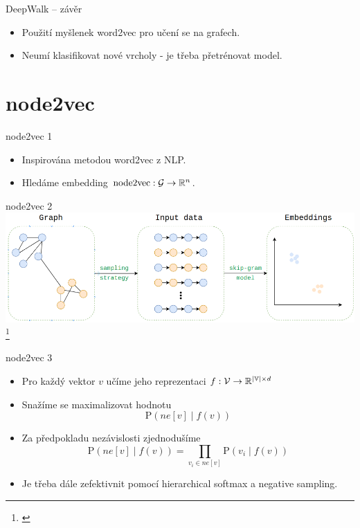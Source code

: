 \documentclass[10pt]{beamer}
\newcommand{\mathspace}{\ensuremath{\mathcal}}
\newcommand{\mathfield}{\ensuremath{\mathbb}}
\begin{document}
\begin{frame}{DeepWalk -- závěr}
	\begin{itemize}
		\item Použití myšlenek word2vec pro učení se na grafech.
		\item Neumí klasifikovat nové vrcholy - je třeba přetrénovat model.
	\end{itemize}
\end{frame}

\section{node2vec}

\begin{frame}{node2vec 1}
	\begin{itemize}
		\item Inspirována metodou word2vec z NLP.
		\item Hledáme embedding \( \mathrm{node2vec} : \mathspace{G} \to \mathfield{R}^n \).
	\end{itemize}
\end{frame}

\begin{frame}{node2vec 2}
	\centering
	\includegraphics[width=0.9\pagewidth]{images/node2vec.png}\footnote{\cite{cohen_node2vec_2018}}
\end{frame}

\begin{frame}{node2vec 3}
	\begin{itemize}
		\item Pro každý vektor \( v \) učíme jeho reprezentaci \( f : \mathspace{V} \to \mathfield{R}^{\left\lvert \mathfield{V} \right\rvert \times d} \)
		\item Snažíme se maximalizovat hodnotu
			\[ \mathrm{P} \left( ne \left[ v \right] \middle| f \left( v \right) \right) \]
		\item Za předpokladu nezávislosti zjednodušíme
			\[ \mathrm{P} \left( ne \left[ v \right] \middle| f \left( v \right) \right) = \prod_{v_i \in ne \left[ v \right]} \mathrm{P} \left( v_i \middle| f \left( v \right) \right) \]
		\item Je třeba dále zefektivnit pomocí hierarchical softmax a negative sampling.
	\end{itemize}
\end{frame}
\end{document}
